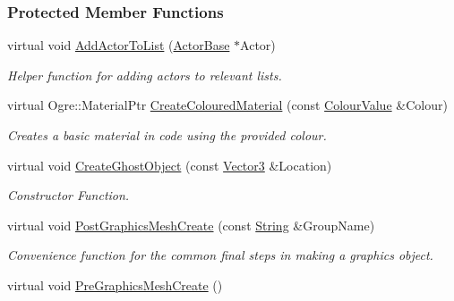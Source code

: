 \subsubsection*{Protected Member Functions}
\begin{DoxyCompactItemize}
\item 
\hypertarget{classphys_1_1AreaEffect_a7af039b84f8d55e2c1c2d5a1b57afd8a}{
virtual void \hyperlink{classphys_1_1AreaEffect_a7af039b84f8d55e2c1c2d5a1b57afd8a}{AddActorToList} (\hyperlink{classphys_1_1ActorBase}{ActorBase} $\ast$Actor)}
\label{classphys_1_1AreaEffect_a7af039b84f8d55e2c1c2d5a1b57afd8a}

\begin{DoxyCompactList}\small\item\em Helper function for adding actors to relevant lists. \item\end{DoxyCompactList}\item 
\hypertarget{classphys_1_1AreaEffect_aef2925aaa94dffb2b4d3755cfe41cb7d}{
virtual Ogre::MaterialPtr \hyperlink{classphys_1_1AreaEffect_aef2925aaa94dffb2b4d3755cfe41cb7d}{CreateColouredMaterial} (const \hyperlink{classphys_1_1ColourValue}{ColourValue} \&Colour)}
\label{classphys_1_1AreaEffect_aef2925aaa94dffb2b4d3755cfe41cb7d}

\begin{DoxyCompactList}\small\item\em Creates a basic material in code using the provided colour. \item\end{DoxyCompactList}\item 
virtual void \hyperlink{classphys_1_1AreaEffect_a6c31aa396851e4e17de53d9e83e2f8ee}{CreateGhostObject} (const \hyperlink{classphys_1_1Vector3}{Vector3} \&Location)
\begin{DoxyCompactList}\small\item\em Constructor Function. \item\end{DoxyCompactList}\item 
\hypertarget{classphys_1_1AreaEffect_ad301f97450bd17deeb66ccef9bc61647}{
virtual void \hyperlink{classphys_1_1AreaEffect_ad301f97450bd17deeb66ccef9bc61647}{PostGraphicsMeshCreate} (const \hyperlink{namespacephys_aa03900411993de7fbfec4789bc1d392e}{String} \&GroupName)}
\label{classphys_1_1AreaEffect_ad301f97450bd17deeb66ccef9bc61647}

\begin{DoxyCompactList}\small\item\em Convenience function for the common final steps in making a graphics object. \item\end{DoxyCompactList}\item 
\hypertarget{classphys_1_1AreaEffect_a923efe92684ce71e138ad182b356b9c0}{
virtual void \hyperlink{classphys_1_1AreaEffect_a923efe92684ce71e138ad182b356b9c0}{PreGraphicsMeshCreate} ()}
\label{classphys_1_1AreaEffect_a923efe92684ce71e138ad182b356b9c0}


\end{DoxyCompactItemize}
